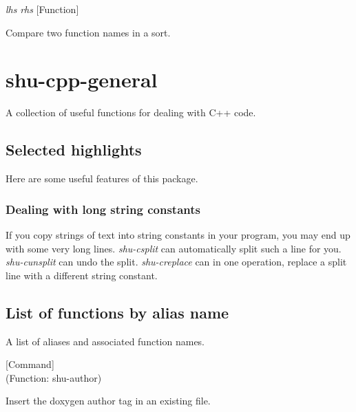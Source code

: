 \vspace{1em}
\noindent
{}
\usebox{\funcname}\emph{lhs} \emph{rhs}
 \hfill [Function]

\begin{doc-string}
Compare two function names in a sort.
\end{doc-string}

\eject
\section{shu-cpp-general}


A collection of useful functions for dealing with C++ code.

\subsection{Selected highlights}

Here are some useful features of this package.

\subsubsection{Dealing with long string constants}

If you copy strings of text into string constants in your program, you may end up
with some very long lines.  \emph{shu-csplit} can automatically split such a line
for you.  \emph{shu-cunsplit} can undo the split.  \emph{shu-creplace} can in one
operation, replace a split line with a different string constant.



\subsection{List of functions by alias name}

A list of aliases and associated function names.



\vspace{1em}
\noindent
{}
\usebox{\funcname}
 \hfill [Command]\\%
 (Function: shu-author)

\begin{doc-string}
Insert the doxygen author tag in an existing file.
\end{doc-string}

